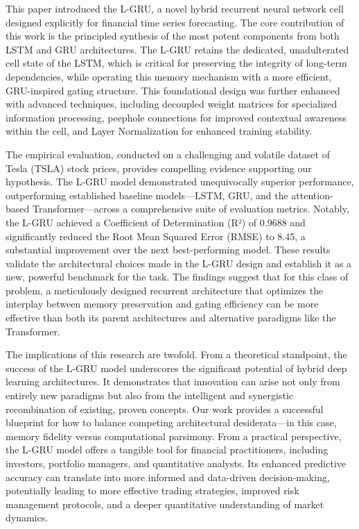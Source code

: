 \documentclass{cys}
\begin{document}
This paper introduced the L-GRU, a novel hybrid recurrent neural network cell designed explicitly for financial time series forecasting. The core contribution of this work is the principled synthesis of the most potent components from both LSTM and GRU architectures. The L-GRU retains the dedicated, unadulterated cell state of the LSTM, which is critical for preserving the integrity of long-term dependencies, while operating this memory mechanism with a more efficient, GRU-inspired gating structure. This foundational design was further enhanced with advanced techniques, including decoupled weight matrices for specialized information processing, peephole connections for improved contextual awareness within the cell, and Layer Normalization for enhanced training stability.

The empirical evaluation, conducted on a challenging and volatile dataset of Tesla (TSLA) stock prices, provides compelling evidence supporting our hypothesis. The L-GRU model demonstrated unequivocally superior performance, outperforming established baseline models—LSTM, GRU, and the attention-based Transformer—across a comprehensive suite of evaluation metrics. Notably, the L-GRU achieved a Coefficient of Determination (R²) of 0.9688 and significantly reduced the Root Mean Squared Error (RMSE) to 8.45, a substantial improvement over the next best-performing model. These results validate the architectural choices made in the L-GRU design and establish it as a new, powerful benchmark for the task. The findings suggest that for this class of problem, a meticulously designed recurrent architecture that optimizes the interplay between memory preservation and gating efficiency can be more effective than both its parent architectures and alternative paradigms like the Transformer.

The implications of this research are twofold. From a theoretical standpoint, the success of the L-GRU model underscores the significant potential of hybrid deep learning architectures. It demonstrates that innovation can arise not only from entirely new paradigms but also from the intelligent and synergistic recombination of existing, proven concepts. Our work provides a successful blueprint for how to balance competing architectural desiderata—in this case, memory fidelity versus computational parsimony. From a practical perspective, the L-GRU model offers a tangible tool for financial practitioners, including investors, portfolio managers, and quantitative analysts. Its enhanced predictive accuracy can translate into more informed and data-driven decision-making, potentially leading to more effective trading strategies, improved risk management protocols, and a deeper quantitative understanding of market dynamics.
\end{document}
